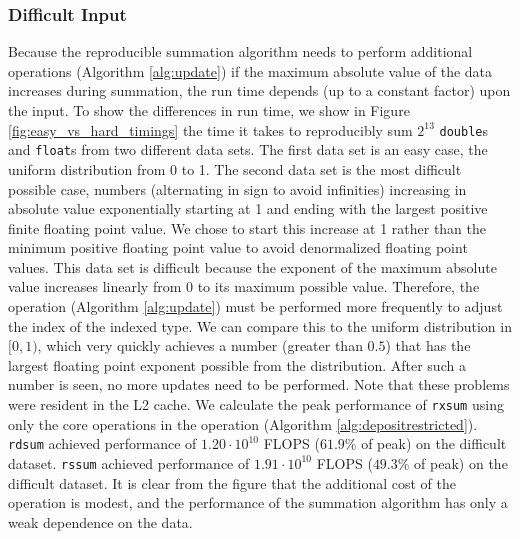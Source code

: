   \subsubsection{Difficult Input}
    Because the reproducible summation algorithm needs to perform additional
    operations (Algorithm \ref{alg:update}) if the maximum absolute value of the
    data increases during summation, the run time depends (up to a constant factor)
    upon the input. To show the differences in run time, we show in Figure
    \ref{fig:easy_vs_hard_timings} the time it takes to reproducibly sum $2^{13}$
    \texttt{double}s and \texttt{float}s from two different data sets. The first
    data set is an easy case, the uniform distribution from 0 to 1. The second data
    set is the most difficult possible case, numbers (alternating in sign to avoid
    infinities) increasing in absolute value exponentially starting at 1 and ending
    with the largest positive finite floating point value. We chose to start this
    increase at 1 rather than the minimum positive floating point value to avoid
    denormalized floating point values. This data set is difficult because the
    exponent of the maximum absolute value increases linearly from 0 to its maximum
    possible value. Therefore, the  operation (Algorithm
    \ref{alg:update}) must be performed more frequently to adjust the index of the
    indexed type. We can compare this to the uniform distribution in $[0, 1)$,
    which very quickly achieves a number (greater than $0.5$) that has the largest
    floating point exponent possible from the distribution. After such a number is
    seen, no more updates need to be performed. Note that these problems were
    resident in the L2 cache. We calculate the peak performance of \texttt{rxsum}
    using only the core operations in the  operation
    (Algorithm \ref{alg:depositrestricted}). \texttt{rdsum} achieved performance of
    $1.20\cdot 10^{10}$ FLOPS ($61.9\%$ of peak) on the difficult dataset.
    \texttt{rssum} achieved performance of $1.91\cdot 10^{10}$ FLOPS ($49.3\%$ of
    peak) on the difficult dataset. It is clear from the figure that the additional
    cost of the  operation is modest, and the performance of the
    summation algorithm has only a weak dependence on the data.
